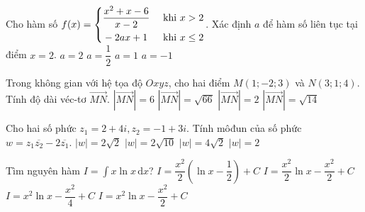 \begin{ex}%
Cho hàm số $f(x)=\left\{\begin{aligned}& \dfrac{x^2+x-6}{x-2} &\mbox{ khi } x>2\\ &-2ax+1 &\mbox{ khi } x\leq 2\end{aligned}\right.$. Xác định $a$ để hàm số liên tục tại điểm $x=2$.
\choice
{$a=2$}
{$a=\dfrac{1}{2}$}
{$a=1$}
{\True $a=-1$}
\end{ex}
\begin{ex}%
Trong không gian với hệ tọa độ $Oxyz$, cho hai điểm $M(1;-2;3)$ và $N(3;1;4)$. Tính độ dài véc-tơ $\overrightarrow{MN}$.
\choice
{$|\overrightarrow{MN}|=6$}
{$|\overrightarrow{MN}|=\sqrt{66}$}
{$|\overrightarrow{MN}|=2$}
{\True $|\overrightarrow{MN}|=\sqrt{14}$}
\end{ex}
\begin{ex}%
Cho hai số phức $z_1=2+4i, z_2=-1+3i$. Tính môđun của số phức $w=z_1\overline{z_2}-2\overline{z_1}$.
\choice
{$|w|=2\sqrt{2}$}
{\True $|w|=2\sqrt{10}$}
{$|w|=4\sqrt{2}$}
{$|w|=2$}
\end{ex}
\begin{ex}%
Tìm nguyên hàm $I=\displaystyle\int x\ln x\mathrm{\, d} x$?
\choice
{\True $I=\dfrac{x^2}{2}\left(\ln x-\dfrac{1}{2}\right)+C$}
{$I=\dfrac{x^2}{2}\ln x-\dfrac{x^2}{2}+C$}
{$I=x^2\ln x-\dfrac{x^2}{4}+C$}
{$I=x^2\ln x-\dfrac{x^2}{2}+C$}
\end{ex}
